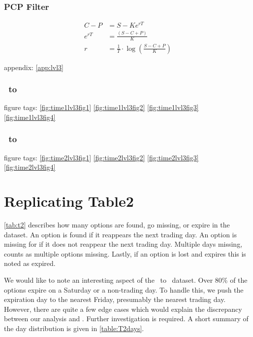 \subsubsection{PCP Filter}
\begin{align}
  \label{eq:pcp}
  C-P &= S-Ke^{rT} \\
  e^{rT} &= \frac{(S-C+P)}{K} \\
  r &= \frac{1}{T} \cdot \log\left(\frac{S-C+P}{K}\right)
\end{align}



appendix: \autoref{app:lvl3}


\subsubsection{\STARTONE\ to \ENDONE }
figure tags: 
\autoref{fig:time1lvl3fig1}
\autoref{fig:time1lvl3fig2}
\autoref{fig:time1lvl3fig3}
\autoref{fig:time1lvl3fig4}
\subsubsection{\STARTTWO\ to \ENDTWO }
figure tags: 
\autoref{fig:time2lvl3fig1}
\autoref{fig:time2lvl3fig2}
\autoref{fig:time2lvl3fig3}
\autoref{fig:time2lvl3fig4}











\section{Replicating Table2}
\autoref{tab:t2} describes how many options are found, go missing, or expire in the dataset. An option is found if it reappears the next trading day. An option is missing for if it does not reappear the next trading day. Multiple days missing, counts as multiple options missing. Lastly, if an option is lost and expires this is noted as expired. 

We would like to note an interesting aspect of the \STARTONE\ to \ENDONE\ dataset. Over 80\% of the options expire on a Saturday or a non-trading day. To handle this, we push the expiration day to the nearest Friday, presumably the nearest trading day. However, there are quite a few edge cases which would explain the discrepancy between our analysis and \citet{constantinides2013}. Further investigation is required. A short summary of the day distribution is given in \autoref{table:T2days}. 

